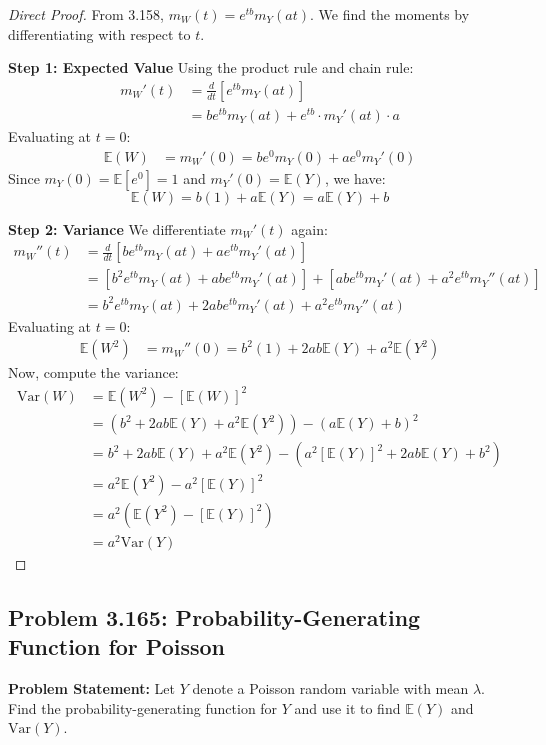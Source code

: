 \documentclass[11pt, a4paper]{article}
\theoremstyle{definition}
\theoremstyle{remark}
\newcommand{\E}{\mathbb{E}}
\newcommand{\Var}{\mathrm{Var}}
\begin{document}
\begin{proof}[Direct Proof]
From 3.158, $m_W(t) = e^{tb} m_Y(at)$. We find the moments by differentiating with respect to $t$.

\textbf{Step 1: Expected Value}
Using the product rule and chain rule:
\begin{align*}
    m_W'(t) &= \frac{d}{dt} \left[ e^{tb} m_Y(at) \right] \\
            &= b e^{tb} m_Y(at) + e^{tb} \cdot m_Y'(at) \cdot a
\end{align*}
Evaluating at $t = 0$:
\begin{align*}
    \E(W) &= m_W'(0) = b e^0 m_Y(0) + a e^0 m_Y'(0)
\end{align*}
Since $m_Y(0) = \E[e^0] = 1$ and $m_Y'(0) = \E(Y)$, we have:
\[ \E(W) = b(1) + a\E(Y) = a\E(Y) + b \]

\textbf{Step 2: Variance}
We differentiate $m_W'(t)$ again:
\begin{align*}
    m_W''(t) &= \frac{d}{dt} \left[ b e^{tb} m_Y(at) + a e^{tb} m_Y'(at) \right] \\
             &= \left[ b^2 e^{tb} m_Y(at) + ab e^{tb} m_Y'(at) \right] + \left[ ab e^{tb} m_Y'(at) + a^2 e^{tb} m_Y''(at) \right] \\
             &= b^2 e^{tb} m_Y(at) + 2ab e^{tb} m_Y'(at) + a^2 e^{tb} m_Y''(at)
\end{align*}
Evaluating at $t = 0$:
\begin{align*}
    \E(W^2) &= m_W''(0) = b^2(1) + 2ab\E(Y) + a^2\E(Y^2)
\end{align*}
Now, compute the variance:
\begin{align*}
    \Var(W) &= \E(W^2) - [\E(W)]^2 \\
            &= \left( b^2 + 2ab\E(Y) + a^2\E(Y^2) \right) - \left( a\E(Y) + b \right)^2 \\
            &= b^2 + 2ab\E(Y) + a^2\E(Y^2) - \left( a^2[\E(Y)]^2 + 2ab\E(Y) + b^2 \right) \\
            &= a^2\E(Y^2) - a^2[\E(Y)]^2 \\
            &= a^2 \left( \E(Y^2) - [\E(Y)]^2 \right) \\
            &= a^2 \Var(Y)
\end{align*}
\end{proof}

\subsection{Problem 3.165: Probability-Generating Function for Poisson}
\textbf{Problem Statement:} Let $Y$ denote a Poisson random variable with mean $\lambda$. Find the probability-generating function for $Y$ and use it to find $\E(Y)$ and $\Var(Y)$.
\end{document}
